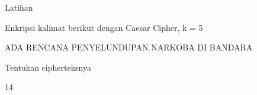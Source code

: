 \documentclass{article}
\begin{document}

Latihan

Enkripsi kalimat berikut dengan Caesar Cipher, k = 5


ADA  RENCANA PENYELUNDUPAN NARKOBA DI BANDARA

Tentukan cipherteksnya

14
\end{document}
